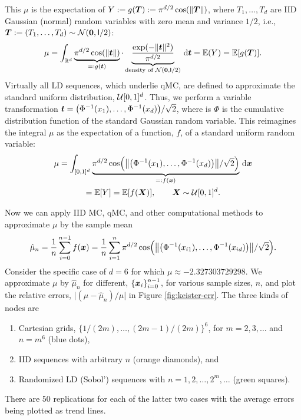 \documentclass{svproc}
\begin{document}
This $\mu$ is the expectation of $Y := g({\boldsymbol{T}}) := \pi^{d/2} \cos(\lVert {\boldsymbol{T}} \rVert)$, where $T_1, \ldots, T_d$ are IID Gaussian (normal) random variables with zero mean and variance $1/2$, i.e., ${\boldsymbol{T}} :=(T_1, \ldots, T_d) \sim {\mathcal{N}}({\boldsymbol{0}},\mathsf{I}/2)$:
\begin{equation}\label{eq:keisterB}
	\mu = \int_{\mathbb{R}^d} \underbrace{\pi^{d/2} \cos(\lVert {\boldsymbol{t}} \rVert)}_{=:g({\boldsymbol{t}})} \cdot \underbrace{\frac{\exp(-\lVert {\boldsymbol{t}} \rVert^2)}{\pi^{d/2}}}_{\text{density of } {\mathcal{N}}({\boldsymbol{0}},\mathsf{I}/2)} \, {\mathrm{d}} {\boldsymbol{t}} = {\mathbb{E}}(Y) = {\mathbb{E}}[g({\boldsymbol{T}})].
\end{equation}
Virtually all LD sequences, which underlie qMC, are defined to approximate the standard uniform distribution, ${\mathcal{U}}[0,1]^d$.  Thus, we perform a variable transformation ${\boldsymbol{t}} = \bigl (\Phi^{-1}(x_1), \ldots, \Phi^{-1}(x_d) \bigr )/\sqrt{2}$,
where is $\Phi$ is the cumulative distribution function of the standard Gaussian random variable.  This reimagines the integral $\mu$ as the expectation of a function, $f$, of a standard uniform random variable:
\begin{multline}\label{eq:keisterC}
	\mu = \int_{[0,1]^d} \underbrace{\pi^{d/2} \cos\Bigl (\bigl \lVert \bigl( \Phi^{-1}(x_1), \ldots, \Phi^{-1}(x_d)\bigr) \bigr\rVert/\sqrt{2}  \Bigr)}_{=:f({\boldsymbol{x}})} \, {\mathrm{d}} {\boldsymbol{x}} \\
	= {\mathbb{E}}[Y]
	= {\mathbb{E}}[f({\boldsymbol{X}})], \qquad {\boldsymbol{X}} \sim {\mathcal{U}}[0,1]^d.
\end{multline}

Now we can apply IID MC, qMC, and other computational methods to approximate $\mu$ by the sample mean
\begin{equation} \label{eq:sample_mean_Keister}
	\hat{\mu}_n = \frac 1n \sum_{i=0}^{n-1} f ({\boldsymbol{x}}) = \frac 1n \sum_{i=1}^n \pi^{d/2} \cos\Bigl (\bigl \lVert \bigl( \Phi^{-1}(x_{i1}), \ldots, \Phi^{-1}(x_{id})\bigr) \bigr\rVert/\sqrt{2}  \Bigr).
\end{equation}
Consider the specific case of $d=6$ for which $\mu \approx -2.327303729298$.  We approximate $\mu$ by $\hat{\mu}_n$ for different, $\{{\boldsymbol{x}}_i\}_{i=0}^{n-1}$, for various sample sizes, $n$, and plot the relative errors, $\lvert (\mu - 	\hat{\mu}_n)/\mu\rvert$ in Figure \ref{fig:keister-err}. The three kinds of nodes are
\begin{enumerate}
	\renewcommand{\labelenumi}{\roman{enumi}.}
	\item Cartesian grids, $\{1/(2m), \ldots, (2m-1)/(2m) \}^6$, for $m = 2, 3, \ldots$ and $n = m^6$ (blue dots),
	\item IID sequences with arbitrary $n$ (orange diamonds), and
	\item Randomized LD (Sobol') sequences with $n = 1, 2, \ldots, 2^m, \ldots $ (green squares).
\end{enumerate}
There are $50$ replications for each of the latter two cases with the average errors being plotted as trend lines.
\end{document}
